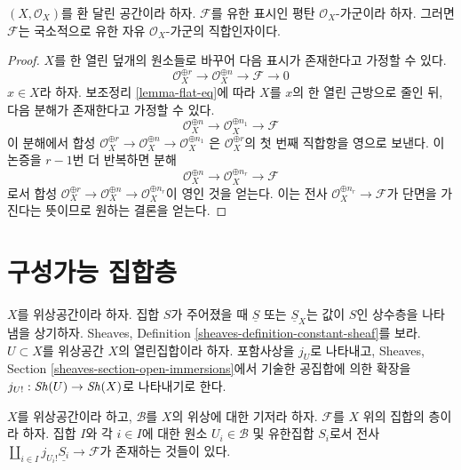 \begin{lemma}
\label{lemma-flat-locally-finite-presentation}
$(X, \mathcal{O}_X)$를 환 달린 공간이라 하자. $\mathcal{F}$를
유한 표시인 평탄 $\mathcal{O}_X$-가군이라 하자. 그러면 $\mathcal{F}$는
국소적으로 유한 자유 $\mathcal{O}_X$-가군의 직합인자이다.
\end{lemma}

\begin{proof}
$X$를 한 열린 덮개의 원소들로 바꾸어 다음 표시가 존재한다고 가정할 수 있다.
$$
\mathcal{O}_X^{\oplus r} \to
\mathcal{O}_X^{\oplus n} \to \mathcal{F} \to 0
$$
$x \in X$라 하자. 보조정리 \ref{lemma-flat-eq}에 따라 $X$를
$x$의 한 열린 근방으로 줄인 뒤, 다음 분해가 존재한다고 가정할 수 있다.
$$
\mathcal{O}_X^{\oplus n} \to
\mathcal{O}_X^{\oplus n_1} \to \mathcal{F}
$$
이 분해에서 합성
$\mathcal{O}_X^{\oplus r} \to \mathcal{O}_X^{\oplus n} \to
\mathcal{O}_X^{\oplus n_1}$
은 $\mathcal{O}_X^{\oplus r}$의 첫 번째 직합항을 영으로 보낸다.
이 논증을 $r - 1$번 더 반복하면 분해
$$
\mathcal{O}_X^{\oplus n} \to
\mathcal{O}_X^{\oplus n_r} \to \mathcal{F}
$$
로서 합성
$\mathcal{O}_X^{\oplus r} \to \mathcal{O}_X^{\oplus n}
\to \mathcal{O}_X^{\oplus n_r}$이 영인 것을 얻는다.
이는 전사 $\mathcal{O}_X^{\oplus n_r} \to \mathcal{F}$가 단면을
가진다는 뜻이므로 원하는 결론을 얻는다.
\end{proof}







\section{구성가능 집합층}
\label{section-constructible}

\noindent
$X$를 위상공간이라 하자. 집합 $S$가 주어졌을 때 $\underline{S}$ 또는
$\underline{S}_X$는 값이 $S$인 상수층을 나타냄을 상기하자. Sheaves,
Definition \ref{sheaves-definition-constant-sheaf}를 보라.
$U \subset X$를 위상공간 $X$의 열린집합이라 하자. 포함사상을 $j_U$로
나타내고, Sheaves, Section \ref{sheaves-section-open-immersions}에서
기술한 공집합에 의한 확장을
$j_{U!} : \mathop{\mathit{Sh}}\nolimits(U) \to \mathop{\mathit{Sh}}\nolimits(X)$로 나타내기로 한다.

\begin{lemma}
\label{lemma-surjection}
$X$를 위상공간이라 하고, $\mathcal{B}$를 $X$의 위상에 대한 기저라 하자.
$\mathcal{F}$를 $X$ 위의 집합의 층이라 하자. 집합 $I$와 각 $i \in I$에
대한 원소 $U_i \in \mathcal{B}$ 및 유한집합 $S_i$로서 전사
$\coprod_{i \in I} j_{U_i!}\underline{S_i} \to \mathcal{F}$가 존재하는
것들이 있다.
\end{lemma}

